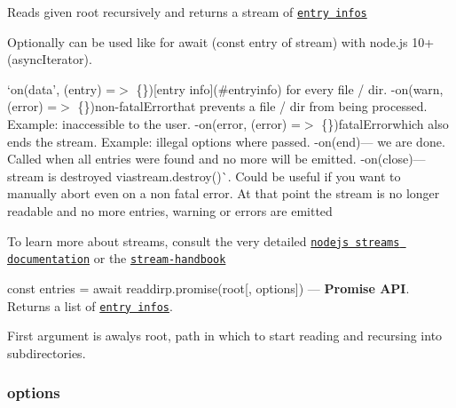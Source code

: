 \begin{DoxyItemize}
\item Reads given root recursively and returns a {\ttfamily stream} of \href{#entryinfo}{\tt entry infos}
\item Optionally can be used like {\ttfamily for await (const entry of stream)} with node.\+js 10+ ({\ttfamily async\+Iterator}).
\item `on(\textquotesingle{}data', (entry) =$>$ \{\}){\ttfamily \mbox{[}entry info\mbox{]}(\#entryinfo) for every file / dir. -\/}on(\textquotesingle{}warn\textquotesingle{}, (error) =$>$ \{\}){\ttfamily non-\/fatal}Error{\ttfamily that prevents a file / dir from being processed. Example\+: inaccessible to the user. -\/}on(\textquotesingle{}error\textquotesingle{}, (error) =$>$ \{\}){\ttfamily fatal}Error{\ttfamily which also ends the stream. Example\+: illegal options where passed. -\/}on(\textquotesingle{}end\textquotesingle{}){\ttfamily — we are done. Called when all entries were found and no more will be emitted. -\/}on(\textquotesingle{}close\textquotesingle{}){\ttfamily — stream is destroyed via}stream.\+destroy()\`{}. Could be useful if you want to manually abort even on a non fatal error. At that point the stream is no longer {\ttfamily readable} and no more entries, warning or errors are emitted
\item To learn more about streams, consult the very detailed \href{https://nodejs.org/api/stream.html}{\tt nodejs streams documentation} or the \href{https://github.com/substack/stream-handbook}{\tt stream-\/handbook}
\end{DoxyItemize}

{\ttfamily const entries = await readdirp.\+promise(root\mbox{[}, options\mbox{]})} — {\bfseries Promise A\+PI}. Returns a list of \href{#entryinfo}{\tt entry infos}.

First argument is awalys {\ttfamily root}, path in which to start reading and recursing into subdirectories.

\subsubsection*{options}


